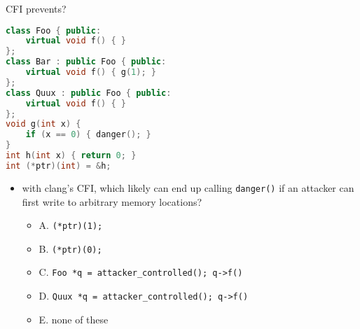 \begin{frame}[fragile,label=cfiPrevents]{CFI prevents?}
\begin{lstlisting}[language=C++,style=script]
class Foo { public:
    virtual void f() { }
};
class Bar : public Foo { public:
    virtual void f() { g(1); }
};
class Quux : public Foo { public:
    virtual void f() { }
};
void g(int x) {
    if (x == 0) { danger(); }
}
int h(int x) { return 0; }
int (*ptr)(int) = &h;
\end{lstlisting}
\begin{itemize}
\item with clang's CFI, which likely can end up calling \texttt{danger()}
      if an attacker can first write to arbitrary memory locations?
    \begin{itemize}
    \item A. \lstinline|(*ptr)(1);| 
    \item B. \lstinline|(*ptr)(0);| 
    \item C. \lstinline|Foo *q = attacker_controlled(); q->f()| 
    \item D. \lstinline|Quux *q = attacker_controlled(); q->f()| 
    \item E. none of these
    \end{itemize}
\end{itemize}
\end{frame}
